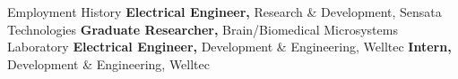 \begin{rubric}{\faBriefcase[solid] Employment History}
\entry*[2024 -- now][]%
	\textbf{Electrical Engineer,} Research \& Development, Sensata Technologies
%
%
\entry*[2021 -- 2023][]%
	\textbf{Graduate Researcher,} Brain/Biomedical Microsystems Laboratory
%
\entry*[2015 -- 2017][]%
	\textbf{Electrical Engineer,} Development \& Engineering, Welltec
%
\entry*[2014 -- 2015][]%
	\textbf{Intern,} Development \& Engineering, Welltec
%
\end{rubric}
